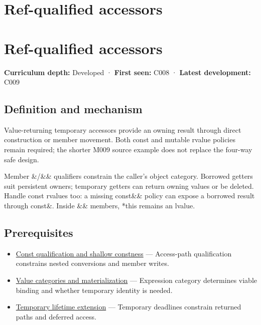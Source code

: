 \hypertarget{appendix-d42039b1d6f7}{}
\section*{Ref-qualified accessors}
\section{Ref-qualified accessors}\label{appendix-d42039b1d6f7-ref-qualified-accessors}

\textbf{Curriculum depth:} Developed · \textbf{First seen:} C008 · \textbf{Latest development:} C009

\subsection{Definition and mechanism}\label{appendix-d42039b1d6f7-definition-and-mechanism}

Value-returning temporary accessors provide an owning result through direct construction or member movement. Both const and mutable rvalue policies remain required; the shorter M009 source example does not replace the four-way safe design.

Member \&/\&\& qualifiers constrain the caller's object category. Borrowed getters suit persistent owners; temporary getters can return owning values or be deleted. Handle const rvalues too: a missing const\&\& policy can expose a borrowed result through const\&. Inside \&\& members, *this remains an lvalue.

\subsection{Prerequisites}\label{appendix-d42039b1d6f7-prerequisites}

\begin{itemize}
\tightlist
\item
  \hyperref[appendix-c25d60fed375]{Const qualification and shallow constness} --- Access-path qualification constrains nested conversions and member writes.
\item
  \hyperref[appendix-1121b30eaeb0]{Value categories and materialization} --- Expression category determines viable binding and whether temporary identity is needed.
\item
  \hyperref[appendix-a978b29bbbb0]{Temporary lifetime extension} --- Temporary deadlines constrain returned paths and deferred access.
\end{itemize}

